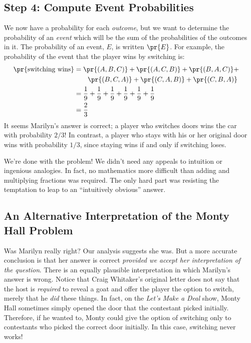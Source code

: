 \subsection{Step 4: Compute Event Probabilities}

We now have a probability for each \textit{outcome}, but we want to
determine the probability of an \textit{event} which will be the sum of
the probabilities of the outcomes in it.  The probability of an event,
$E$, is written $\pr{E}$.  For example, the probability of the event that
the player wins by switching is:
%
\begin{align*}
\pr{\text{switching wins}}
    & = \pr{(A, B, C)} + \pr{(A, C, B)} + \pr{(B, A, C)} + \\
    & \qquad \pr{(B, C, A)} + \pr{(C, A, B)} + \pr{(C, B, A)} \\
    & = \frac{1}{9} + \frac{1}{9} + \frac{1}{9} + 
        \frac{1}{9} + \frac{1}{9} + \frac{1}{9} \\
    & = \frac{2}{3}
\end{align*}
%
It seems Marilyn's answer is correct; a player who switches doors wins
the car with probability $2/3$!  In contrast, a player who stays with
his or her original door wins with probability $1/3$, since staying
wins if and only if switching loses.

We're done with the problem!  We didn't need any appeals to intuition
or ingenious analogies.  In fact, no mathematics more difficult than
adding and multiplying fractions was required.  The only hard part was
resisting the temptation to leap to an ``intuitively obvious'' answer.

\subsection{An Alternative Interpretation of the Monty Hall Problem}

Was Marilyn really right?  Our analysis suggests she was.  But a more
accurate conclusion is that her answer is correct \textit{provided we
accept her interpretation of the question}.  There is an equally
plausible interpretation in which Marilyn's answer is wrong.  Notice
that Craig Whitaker's original letter does not say that the host is
\textit{required} to reveal a goat and offer the player the option to
switch, merely that he \textit{did} these things.  In fact, on the
\textit{Let's Make a Deal} show, Monty Hall sometimes simply opened
the door that the contestant picked initially.  Therefore, if he
wanted to, Monty could give the option of switching only to
contestants who picked the correct door initially.  In this case,
switching never works!

